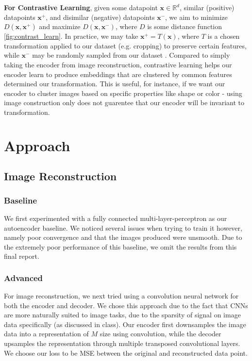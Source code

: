 \documentclass{article}
\begin{document}
\textbf{For Contrastive Learning}, given some datapoint $\mathbf{x} \in \mathbb{R}^d$, similar (positive) datapoints $\mathbf{x}^+$, and disimilar (negative) datapoints $\mathbf{x}^-$, we aim to minimize $D(\textbf{x}, \textbf{x}^+)$ and maximize $D(\textbf{x}, \textbf{x}^-)$, where $D$ is some distance function \ref{fig:contrast_learn}. In practice, we may take $\textbf{x}^+ = T(\textbf{x})$, where $T$ is a chosen transformation applied to our dataset (e.g. cropping) to preserve certain features, while $\textbf{x}^-$ may be randomly sampled from our dataset \cite{foundationsCVbook}. Compared to simply taking the encoder from image reconstruction, contrastive learning helps our encoder learn to produce embeddings that are clustered by common features determined our transformation. This is useful, for instance, if we want our encoder to cluster images based on specific properties like shape or color - using image construction only does not guarentee that our encoder will be invariant to transformation. 

\section{Approach}

\subsection{Image Reconstruction}

\subsubsection{Baseline}
We first experimented with a fully connected multi-layer-perceptron as our autoencoder baseline. We noticed several issues when trying to train it however, namely poor convergence and that the images produced were unsmooth. Due to the extremely poor performance of this baseline, we omit the results from this final report.

\subsubsection{Advanced}

For image reconstruction, we next tried using a convolution neural network for both the encoder and decoder. We chose this approach due to the fact that CNNs are more naturally suited to image tasks, due to the sparsity of signal on image data specifically (as discussed in class). Our encoder first downsamples the image data into a representation of $M$ size using convolution, while the decoder upsamples the representation through multiple transposed convolutional layers. We choose our loss to be MSE between the original and reconstructed data point.
\end{document}
